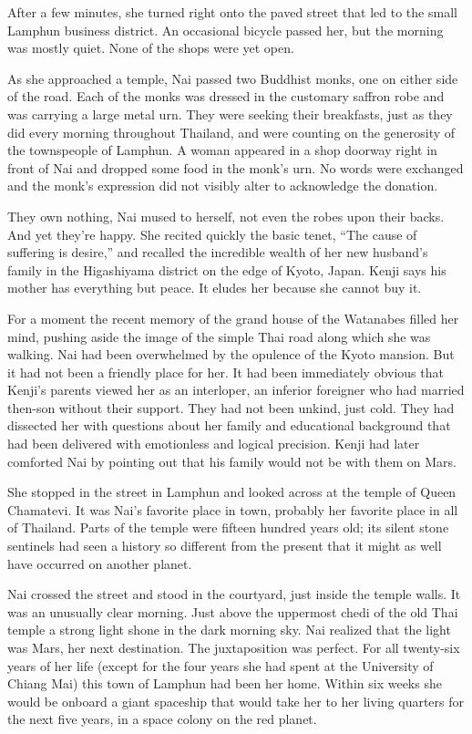 \documentclass[]{article}
\begin{document}
{After a few minutes, she turned right onto the paved street that led to the small Lamphun business district.  An occasional bicycle passed her, but the morning was mostly quiet.  None of the shops were yet open.

As she approached a temple, Nai passed two Buddhist monks, one on either side of the road.  Each of the monks was dressed in the customary saffron robe and was carrying a large metal urn.  They were seeking their breakfasts, just as they did every morning throughout Thailand, and were counting on the generosity of the townspeople of Lamphun.  A woman appeared in a shop doorway right in front of Nai and dropped some food in the monk’s urn.  No words were exchanged and the monk’s expression did not visibly alter to acknowledge the donation.

They own nothing, Nai mused to herself, not even the robes upon their backs.  And yet they’re happy.  She recited quickly the basic tenet, “The cause of suffering is desire,” and recalled the incredible wealth of her new husband’s family in the Higashiyama district on the edge of Kyoto, Japan.  Kenji says his mother has everything but peace.  It eludes her because she cannot buy it.

For a moment the recent memory of the grand house of the Watanabes filled her mind, pushing aside the image of the simple Thai road along which she was walking.  Nai had been overwhelmed by the opulence of the Kyoto mansion.  But it had not been a friendly place for her.  It had been immediately obvious that Kenji’s parents viewed her as an interloper, an inferior foreigner who had married then-son without their support.  They had not been unkind, just cold.  They had dissected her with questions about her family and educational background that had been delivered with emotionless and logical precision.  Kenji had later comforted Nai by pointing out that his family would not be with them on Mars.

She stopped in the street in Lamphun and looked across at the temple of Queen Chamatevi.  It was Nai’s favorite place in town, probably her favorite place in all of Thailand.  Parts of the temple were fifteen hundred years old; its silent stone sentinels had seen a history so different from the present that it might as well have occurred on another planet.

Nai crossed the street and stood in the courtyard, just inside the temple walls.  It was an unusually clear morning.  Just above the uppermost chedi of the old Thai temple a strong light shone in the dark morning sky.  Nai realized that the light was Mars, her next destination.  The juxtaposition was perfect.  For all twenty-six years of her life (except for the four years she had spent at the University of Chiang Mai) this town of Lamphun had been her home.  Within six weeks she would be onboard a giant spaceship that would take her to her living quarters for the next five years, in a space colony on the red planet.

}
\end{document}
